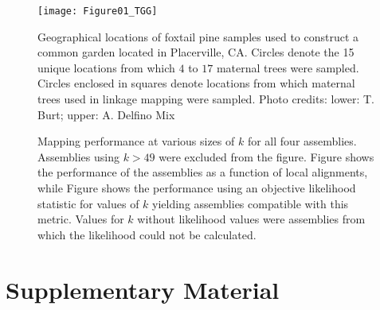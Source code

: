 \documentclass[11pt]{article}
\begin{document}
\begin{figure}[ht]
\centering
\texttt{[image: Figure01\_TGG]}
\caption{Geographical locations of foxtail pine samples used to construct a common garden located in Placerville, CA. Circles 
denote the 15 unique locations from which $4$ to $17$ maternal trees were sampled. Circles enclosed in squares denote 
locations from which maternal trees used in linkage mapping were sampled. Photo credits: lower: T. Burt; upper: A. Delfino Mix}
\label{f:Figure01_TGG}
\end{figure}

\begin{figure}[ht]
\centering
{}
\caption{Mapping performance at various sizes of $k$ for all four assemblies.  Assemblies using 
$k>49$ were excluded from the figure.  Figure  shows the performance of the assemblies as a 
function of local alignments, while Figure  shows the performance using an objective 
likelihood statistic for values of $k$ yielding assemblies compatible with this metric. Values for $k$ without 
likelihood values were assemblies from which the likelihood could not be calculated.}
\label{f:mapping_performance}
\end{figure}

\clearpage

\section*{Supplementary Material}
\makeatletter
\setcounter{figure}{0}
\setcounter{table}{0}
\renewcommand{\thefigure}{S\@arabic\c@figure}
\renewcommand{\thetable}{S\@arabic\c@table}
\makeatother

\end{document}
